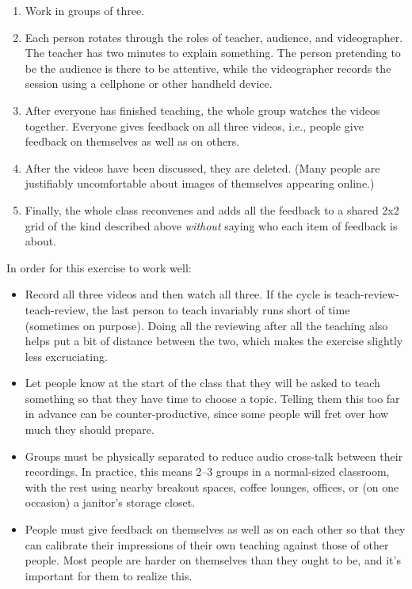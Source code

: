 \begin{enumerate}

\item
  Work in groups of three.

\item
  Each person rotates through the roles of teacher, audience, and videographer.
  The teacher has two minutes to explain something.
  The person pretending to be the audience is there to be attentive,
  while the videographer records the session using a cellphone or other handheld device.

\item
  After everyone has finished teaching,
  the whole group watches the videos together.
  Everyone gives feedback on all three videos,
  i.e., people give feedback on themselves as well as on others.

\item
  After the videos have been discussed,
  they are deleted.
  (Many people are justifiably uncomfortable about images of themselves appearing online.)

\item
  Finally,
  the whole class reconvenes
  and adds all the feedback to a shared 2x2 grid of the kind described above
  \emph{without} saying who each item of feedback is about.

\end{enumerate}

In order for this exercise to work well:

\begin{itemize}

\item
  Record all three videos and then watch all three.
  If the cycle is teach-review-teach-review,
  the last person to teach invariably runs short of time
  (sometimes on purpose).
  Doing all the reviewing after all the teaching
  also helps put a bit of distance between the two,
  which makes the exercise slightly less excruciating.

\item
  Let people know at the start of the class that they will be asked to teach something
  so that they have time to choose a topic.
  Telling them this too far in advance can be counter-productive,
  since some people will fret over how much they should prepare.

\item
  Groups must be physically separated to reduce audio cross-talk between their recordings.
  In practice,
  this means 2--3 groups in a normal-sized classroom,
  with the rest using nearby breakout spaces, coffee lounges, offices,
  or (on one occasion) a janitor's storage closet.

\item
  People must give feedback on themselves as well as on each other
  so that they can calibrate their impressions of their own teaching
  against those of other people.
  Most people are harder on themselves than they ought to be,
  and it's important for them to realize this.

\end{itemize}

